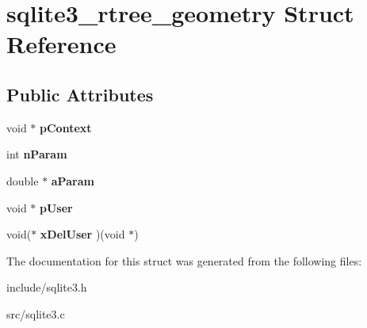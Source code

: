 \hypertarget{structsqlite3__rtree__geometry}{\section{sqlite3\-\_\-rtree\-\_\-geometry Struct Reference}
\label{structsqlite3__rtree__geometry}
}
\subsection*{Public Attributes}
\begin{DoxyCompactItemize}
\item 
\hypertarget{structsqlite3__rtree__geometry_a33f98691626846c1317419654d5c5f51}{void $\ast$ {\bfseries p\-Context}}\label{structsqlite3__rtree__geometry_a33f98691626846c1317419654d5c5f51}

\item 
\hypertarget{structsqlite3__rtree__geometry_ada7b9eba82660e3321dd4c93526697c9}{int {\bfseries n\-Param}}\label{structsqlite3__rtree__geometry_ada7b9eba82660e3321dd4c93526697c9}

\item 
\hypertarget{structsqlite3__rtree__geometry_aa23f6565e6fee2416444333a75716057}{double $\ast$ {\bfseries a\-Param}}\label{structsqlite3__rtree__geometry_aa23f6565e6fee2416444333a75716057}

\item 
\hypertarget{structsqlite3__rtree__geometry_a6fdedfd741cf5055f9562298cd32dc74}{void $\ast$ {\bfseries p\-User}}\label{structsqlite3__rtree__geometry_a6fdedfd741cf5055f9562298cd32dc74}

\item 
\hypertarget{structsqlite3__rtree__geometry_afa1ed10f488b306df354efe56efdf287}{void($\ast$ {\bfseries x\-Del\-User} )(void $\ast$)}\label{structsqlite3__rtree__geometry_afa1ed10f488b306df354efe56efdf287}

\end{DoxyCompactItemize}


The documentation for this struct was generated from the following files\-:\begin{DoxyCompactItemize}
\item 
include/sqlite3.\-h\item 
src/sqlite3.\-c\end{DoxyCompactItemize}

